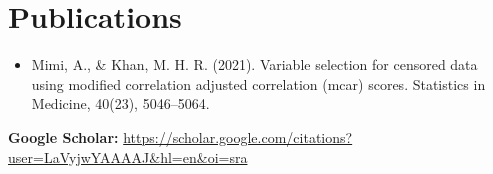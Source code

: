 \documentclass[10pt, letterpaper]{article}
\newenvironment{onecolentry}{
    \begin{adjustwidth}{
        0 cm + 0.00001 cm
    }{
        0 cm + 0.00001 cm
    }
}{
    \end{adjustwidth}
} %
\begin{document}

    \section{Publications}
        
        \begin{samepage}
        \begin{itemize}
            \item Mimi, A., \& Khan, M. H. R. (2021). Variable selection for censored data using modified correlation adjusted correlation (mcar) scores. Statistics in Medicine, 40(23), 5046–5064.     
           

        \end{itemize}
        \textbf{Google Scholar:} \href{https://scholar.google.com/citations?user=LaVyjwYAAAAJ&hl=en&oi=sra}{https://scholar.google.com/citations?user=LaVyjwYAAAAJ\&hl=en\&oi=sra}
         \end{samepage}
\end{document}
